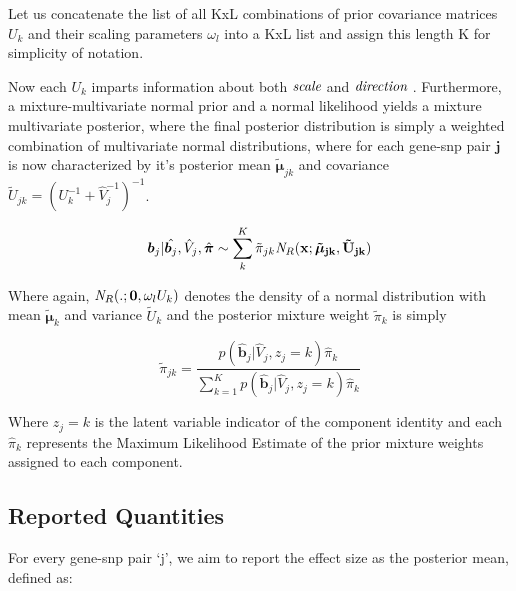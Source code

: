 \begin{enumerate}
Let us concatenate the list of all KxL combinations of prior covariance matrices $U_{k}$ and their scaling parameters $\omega_{l}$ into a KxL list and assign this length K for simplicity of notation.

Now each $U_{k}$ imparts information about both $\emph{scale}$ and $\emph{direction}$
. 
Furthermore, a mixture-multivariate normal prior and a normal likelihood yields a mixture multivariate posterior, where the final posterior distribution is simply a weighted combination of multivariate normal distributions, where for each gene-snp pair $\textbf{j}$ is now characterized by it's posterior mean $\tilde{\bm{\mu}}_{jk}$ and covariance  $\tilde{U}_{jk} = (U_{k}^{-1} + \hat{V}_{j}^{-1})^{-1}$.

\begin{equation}
\begin{aligned}
  \label{eq:mixpost}
\bm{b}_{j} | \hat{\bm{b}_{j}}, \hat{V}_{j}, \hat{\bm{\pi}} 
\sim \sum_{k}^{K}  \tilde \pi_{jk} {\it N}_R (\bf{x};\bm{\tilde{\mu}}_{jk},\tilde{U} _{jk} )%


\end{aligned}
\end{equation}

Where again, ${\it N}_R(.; \bm{0}, \omega_l U_{k})$ denotes the density of a normal distribution with mean $\bm{\tilde{\mu}}_{k}$ and variance $\tilde{U} _{k}$ and the posterior mixture weight $\tilde \pi_{k}$ is simply 



 \begin{equation}
 \label{post.pi}
\tilde \pi_{jk} =\frac{ p(\hat{\bm{b}}_{j}| \hat{V}_{j}, z_{j}=k) \hat \pi_{k} } {\sum_{k=1}^{K} p(\hat{\bm{b}}_{j}| \hat{V}_{j}, z_{j}=k) \hat\pi_{k}}
\end{equation}

Where $z_{j}=k$ is the latent variable indicator of the component identity and each $\hat\pi_{k}$ represents the Maximum Likelihood Estimate of the prior mixture weights assigned to each component.


\subsection{Reported Quantities}

For every gene-snp pair `j', we aim to report the effect size as the posterior mean, defined as:


\end{enumerate}
